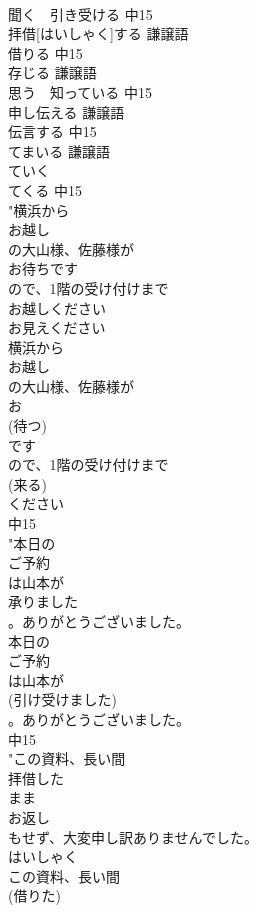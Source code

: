 \documentclass[8pt]{extreport}
\begin{document}
\begin{CJK}{UTF8}{min}
\\	聞く　引き受ける			中15
\\	拝借[はいしゃく]する	謙譲語　
\\	借りる			中15
\\	存じる	謙譲語　
\\	思う　知っている			中15
\\	申し伝える	謙譲語　
\\	伝言する			中15
\\	てまいる	謙譲語　
\\	ていく　
\\	てくる			中15
\\	"横浜から
\\	お越し
\\	の大山様、佐藤様が
\\	お待ちです
\\	ので、1階の受け付けまで
\\	お越しください
\\	お見えください
\\	横浜から
\\	お越し
\\	の大山様、佐藤様が
\\	お
\\	(待つ)
\\	です
\\	ので、1階の受け付けまで
\\	(来る)
\\	ください
\\	中15
\\	"本日の
\\	ご予約
\\	は山本が
\\	承りました
\\	。ありがとうございました。
\\	本日の
\\	ご予約
\\	は山本が
\\	(引け受けました)
\\	。ありがとうございました。
\\	中15
\\	"この資料、長い間
\\	拝借した
\\	まま
\\	お返し
\\	もせず、大変申し訳ありませんでした。　
\\	はいしゃく
\\	この資料、長い間
\\	(借りた)

\end{CJK}
\end{document}
